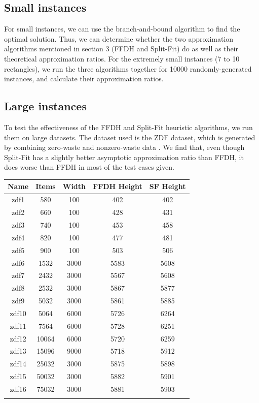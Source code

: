 \documentclass{article}
\begin{document}
\subsection{Small instances}
For small instances, we can use the branch-and-bound algorithm to find the optimal solution. Thus, we can determine whether the two approximation algorithms mentioned in section 3 (FFDH and Split-Fit) do as well as their theoretical approximation ratios. For the extremely small instances (7 to 10 rectangles), we run the three algorithms together for 10000 randomly-generated instances, and calculate their approximation ratios. 

\subsection{Large instances}
To test the effectiveness of the FFDH and Split-Fit heuristic algorithms, we run them on large datasets. The dataset used is the ZDF dataset, which is generated by combining zero-waste and nonzero-waste data \cite{zdf}. We find that, even though Split-Fit has a slightly better asymptotic approximation ratio than FFDH, it does worse than FFDH in most of the test cases given.

\centering
\begin{tabular}{|c|c|c|c|c|}

\hline Name & Items & Width & FFDH Height & SF Height \\
\hline zdf1 & 580 & 100 & 402 & 402 \\
\hline zdf2 & 660 & 100 & 428 & 431 \\
\hline zdf3 & 740 & 100 & 453 & 458 \\
\hline zdf4 & 820 & 100 & 477 & 481 \\
\hline zdf5 & 900 & 100 & 503 & 506 \\
\hline zdf6 & 1532 & 3000 & 5583 & 5608 \\
\hline zdf7 & 2432 & 3000 & 5567 & 5608 \\
\hline zdf8 & 2532 & 3000 & 5867 & 5877 \\
\hline zdf9 & 5032 & 3000 & 5861 & 5885 \\
\hline zdf10 & 5064 & 6000 & 5726 & 6264 \\
\hline zdf11 & 7564 & 6000 & 5728 & 6251 \\
\hline zdf12 & 10064 & 6000 & 5720 & 6259 \\
\hline zdf13 & 15096 & 9000 & 5718 & 5912 \\
\hline zdf14 & 25032 & 3000 & 5875 & 5898 \\
\hline zdf15 & 50032 & 3000 & 5882 & 5901 \\
\hline zdf16 & 75032 & 3000 & 5881 & 5903 \\
\hline

\label{table:zdftest}
\end{tabular}
\end{document}
